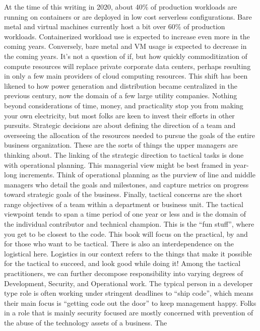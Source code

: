 \justify{}
At the time of this writing in 2020, about 40\% of production workloads are
running on containers or are deployed in low cost serverless configurations.
Bare metal and virtual machines currently host a bit over 60\% of production
workloads. Containerized workload use is expected to increase even more in
the coming years. Conversely, bare metal and VM usage is expected to
decrease in the coming years.
\justify{}
It's not a question of if, but how quickly commoditization of compute resources
will replace private corporate data centers, perhaps resulting in only a
few main providers of cloud computing resources. This shift has been likened
to how power generation and distribution became centralized
in the previous century, now the domain of a few large utility companies.
Nothing beyond considerations of time, money, and practicality stop you
from making your own electricity, but most folks are keen to invest their
efforts in other pursuits.
\justify{}
Strategic decisions are about defining the direction of a team and overseeing
the allocation of the resources needed to pursue the goals of the entire
business organization. These are the sorts of things the upper managers are
thinking about. The linking of the strategic direction to tactical tasks is
done with operational planning. This managerial view might be best framed in
year-long increments. Think of operational planning as the purview of line
and middle managers who detail the goals and milestones, and capture metrics
on progress toward strategic goals of the business. Finally, tactical concerns
are the short range objectives of a team within a department or business unit.
The tactical viewpoint tends to span a time period of one year or less and is
the domain of the individual contributor and technical champion. This is the
``fun stuff'', where you get to be closest to the code. This book will focus
on the practical, by and for those who want to be tactical. There is also
an interdependence on the logistical here. Logistics in our context refers to
the things that make it possible for the tactical to succeed, and look good
while doing it!
\justify{}
Among the tactical practitioners, we can further decompose responsibility into
varying degrees of Development, Security, and Operational work. The typical
person in a developer type role is often working under stringent deadlines to
``ship code'', which means their main focus is ``getting code out the door'' to
keep management happy. Folks in a role that is mainly security focused are mostly
concerned with prevention of the abuse of the technology assets of a business. The
